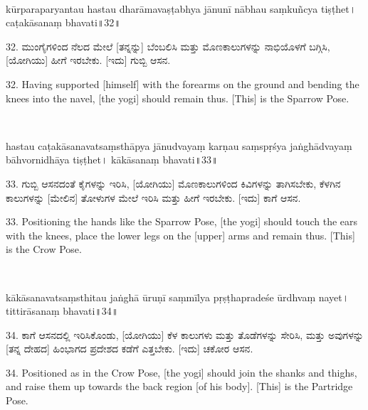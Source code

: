 ~\vskip 1cm

\dummyimage
\begin{sans}
kūrparaparyantau hastau dharāmavaṣṭabhya jānunī nābhau saṃkuñcya  tiṣṭhet। caṭakāsanaṃ bhavati॥32॥
\end{sans}
\bigskip

\begin{kan}
32.	ಮುಂಗೈಗಳಿಂದ ನೆಲದ ಮೇಲೆ [ತನ್ನನ್ನು] ಬೆಂಬಲಿಸಿ ಮತ್ತು ಮೊಣಕಾಲುಗಳನ್ನು ನಾಭಿಯೊಳಗೆ ಬಗ್ಗಿಸಿ, [ಯೋಗಿಯು] ಹೀಗೆ ಇರಬೇಕು. [ಇದು] ಗುಬ್ಬಿ ಆಸನ.
\end{kan}
\bigskip

\begin{eng}
32. Having supported [himself] with the forearms on the ground and bending the knees into the navel, [the yogi] should remain thus. [This] is the Sparrow Pose.
\end{eng}

\newpage

~\vskip 1cm

\dummyimage
\begin{sans}
hastau caṭakāsanavatsaṃsthāpya jānudvayaṃ karṇau saṃspṛśya jaṅghādvayaṃ bāhvornidhāya tiṣṭhet। kākāsanaṃ bhavati॥33॥
\end{sans}
\bigskip

\begin{kan}
33.	ಗುಬ್ಬಿ ಆಸನದಂತೆ ಕೈಗಳನ್ನು ಇರಿಸಿ, [ಯೋಗಿಯು] ಮೊಣಕಾಲುಗಳಿಂದ ಕಿವಿಗಳನ್ನು ತಾಗಿಸಬೇಕು, ಕೆಳಗಿನ ಕಾಲುಗಳನ್ನು [ಮೇಲಿನ] ತೋಳುಗಳ ಮೇಲೆ ಇರಿಸಿ ಮತ್ತು ಹೀಗೆ ಇರಬೇಕು. [ಇದು] ಕಾಗೆ ಆಸನ.
\end{kan}
\bigskip

\begin{eng}
33. Positioning the hands like the Sparrow Pose, [the yogi] should touch the ears with the knees, place the lower legs on the [upper] arms and remain thus. [This] is the Crow Pose.
\end{eng}

\newpage

~\vskip 1cm

\dummyimage
\begin{sans}
kākāsanavatsaṃsthitau jaṅghā ūruṇī saṃmīlya pṛṣṭhapradeśe ūrdhvaṃ nayet। tittirāsanaṃ bhavati॥34॥
\end{sans}
\bigskip

\begin{kan}
34.	ಕಾಗೆ ಆಸನದಲ್ಲಿ ಇರಿಸಿಕೊಂಡು, [ಯೋಗಿಯು] ಕೆಳ ಕಾಲುಗಳು ಮತ್ತು ತೊಡೆಗಳನ್ನು ಸೇರಿಸಿ, ಮತ್ತು ಅವುಗಳನ್ನು [ತನ್ನ ದೇಹದ] ಹಿಂಭಾಗದ ಪ್ರದೇಶದ ಕಡೆಗೆ ಎತ್ತಬೇಕು. [ಇದು] ಚಕೋರ ಆಸನ.
\end{kan}
\bigskip

\begin{eng}
34. Positioned as in the Crow Pose, [the yogi] should join the shanks and thighs, and raise them up towards the back region [of his body]. [This] is the Partridge Pose.
\end{eng}

